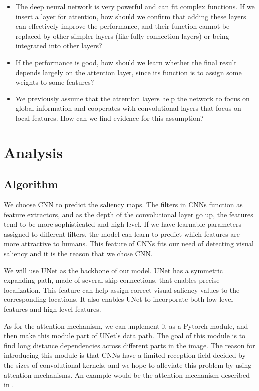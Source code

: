 \documentclass[12pt]{article}
\begin{document}
\begin{itemize}
    \item The deep neural network is very powerful and can fit complex functions. If we insert a layer for attention, how should we confirm that adding these layers can effectively improve the performance, and their function cannot be replaced by other simpler layers (like fully connection layers) or being integrated into other layers?
    \item If the performance is good, how should we learn whether the final result depends largely on the attention layer, since its function is to assign some weights to some features?
    \item We previously assume that the attention layers help the network to focus on global information and cooperates with convolutional layers that focus on local features. How can we find evidence for this assumption?
\end{itemize}

\section{Analysis}
\subsection{Algorithm}
We choose CNN to predict the saliency maps. The filters in CNNs function as feature extractors,
and as the depth of the convolutional layer go up, the features tend to be more sophisticated
and high level. If we have learnable parameters assigned to different filters, the model can
learn to predict which features are more attractive to humans.
This feature of CNNs fits our need of detecting visual saliency and it is the reason that we
chose CNN.

We will use UNet \cite{ronnebergerUNetConvolutionalNetworks2015} as the backbone of our model. UNet has a symmetric expanding path, made of
several skip connections, that enables precise localization. This feature can help assign correct visual saliency values
to the corresponding locations. It also enables UNet to incorporate both low level features and
high level features.

As for the attention mechanism, we can implement it as a Pytorch module, and then make this module
part of UNet's data path. The goal of this module is to find long distance dependencies across
different parts in the image. The reason for introducing this module is that CNNs have a limited
reception field decided by the sizes of convolutional kernels, and we hope to alleviate this problem
by using attention mechanisms. An example would be the attention mechanism described in \cite{zhangSelfAttentionGenerativeAdversarial2019a}.
\end{document}
